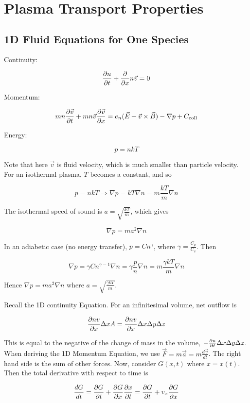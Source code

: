 \documentclass[12pt]{article}
\begin{document}
\section{Plasma Transport Properties}
    
\subsection{1D Fluid Equations for One Species}

Continuity:

$$\frac{\partial n}{\partial t} + \frac{\partial }{\partial x}n\vec v = 0$$

Momentum:

$$mn\frac{\partial \vec v}{\partial t} + mn\vec v\frac{\partial \vec v}{\partial x} = e_n(\vec E + \vec v \times \vec B) - \nabla p + C_{\text{coll}}$$

Energy:

$$p = nkT$$

Note that here $\vec v$ is fluid velocity, which is much smaller than particle velocity. For an isothermal plasma, $T$ becomes a constant, and so

$$p = nkT \Rightarrow \nabla p = kT\nabla n = m \frac{kT}{m} \nabla n$$

The isothermal speed of sound is $a = \sqrt{\frac{kT}{m}}$, which gives

$$\nabla p = ma^2 \nabla n$$

In an adiabetic case (no energy transfer), $p = Cn^\gamma$, where $\gamma = \frac{C_p}{C_v}$. Then

$$\nabla p = \gamma Cn^{\gamma-1}\nabla n = \gamma \frac{p}{n} \nabla n = m\frac{\gamma kT}{m} \nabla n$$

Hence $\nabla p = ma^2\nabla n$ where $a = \sqrt{\frac{\gamma kT}{m}}$.

Recall the 1D continuity Equation. For an infinitesimal volume, net outflow is

$$\frac{\partial nv}{\partial x} \Delta xA = \frac{\partial nv}{\partial x} \Delta x \Delta y \Delta z$$

This is equal to the negative of the change of mass in the volume, $-\frac{\partial n}{\partial t}\Delta x\Delta y\Delta z$. \\

When deriving the 1D Momentum Equation, we use $\vec F = m\vec a = m \frac{d\vec v}{dt}$. The right hand side is the sum of other forces. Now, consider $G(x,t)$ where $x = x(t)$. Then the total derivative with respect to time is

$$\frac{dG}{dt} = \frac{\partial G}{\partial t} + \frac{\partial G}{\partial x}\frac{\partial x}{\partial t} = \frac{\partial G}{\partial t} + v_x\frac{\partial G}{\partial x}$$
\end{document}
